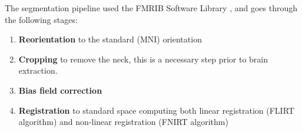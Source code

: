 \documentclass[11pt]{article}
\theoremstyle{definition}
\theoremstyle{remark}
\begin{document}
The segmentation pipeline used the FMRIB Software Library \cite{fsl60}, \cite{jenkinson2012fsl} and goes through the following stages:
\cite{hannoun2018automatic}
\begin{enumerate}  
  \item \textbf{Reorientation} to the standard (MNI) orientation
  \item \textbf{Cropping} to remove the neck, this is a necessary step prior to brain extraction. 
  \item \textbf{Bias field correction} 
  \item \textbf{Registration} to standard space computing both linear registration (FLIRT algorithm) and non-linear registration (FNIRT algorithm)

\end{enumerate}
\end{document}
